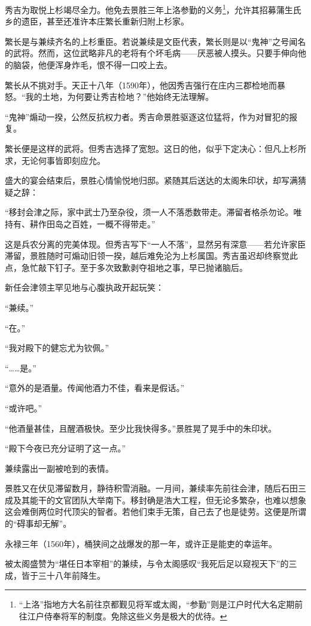\documentclass[
]{article}
\begin{document}
秀吉为取悦上杉竭尽全力。他免去景胜三年上洛参勤的义务\footnote{``上洛''指地方大名前往京都觐见将军或太阁，``参勤''则是江户时代大名定期前往江户侍奉将军的制度。免除这些义务是极大的优待。}，允许其招募蒲生氏乡的遗臣，甚至还准许本庄繁长重新归附上杉家。

繁长是与兼续齐名的上杉重臣。若说兼续是文臣代表，繁长则是以``鬼神''之号闻名的武将。然而，这位武略非凡的老将有个坏毛病------厌恶被人摸头。只要手伸向他的脑袋，他便浑身炸毛，恨不得一口咬上去。

繁长从不挑对手。天正十八年（1590年），他因秀吉强行在庄内三郡检地而暴怒。``我的土地，为何要让秀吉检地？''他始终无法理解。

``鬼神''煽动一揆，公然反抗权力者。秀吉命景胜驱逐这位猛将，作为对冒犯的报复。

繁长便是这样的武将。但秀吉选择了宽恕。这日的他，似乎下定决心：但凡上杉所求，无论何事皆即刻应允。

盛大的宴会结束后，景胜心情愉悦地归邸。紧随其后送达的太阁朱印状，却写满猜疑之辞：

``移封会津之际，家中武士乃至杂役，须一人不落悉数带走。滞留者格杀勿论。唯持有、耕作田岛之百姓，一概不得带走。''

这是兵农分离的完美体现。但秀吉写下``一人不落''，显然另有深意------若允许家臣滞留，景胜随时可煽动旧领一揆，越后难免沦为上杉属国。秀吉虽迟却终察觉此点，急忙敲下钉子。至于多次致歉剥夺祖地之事，早已抛诸脑后。

新任会津领主罕见地与心腹执政开起玩笑：

``兼续。''

``在。''

``我对殿下的健忘尤为钦佩。''

``\ldots\ldots 是。''

``意外的是酒量。传闻他酒力不佳，看来是假话。''

``或许吧。''

``他酒量甚佳，且醒酒极快。至少比我快得多。''景胜晃了晃手中的朱印状。

``殿下今夜已充分证明了这一点。''

兼续露出一副被呛到的表情。

景胜又在伏见滞留数月，静待积雪消融。一月间，兼续率先前往会津，随后石田三成及其能干的文官团队大举南下。移封确是浩大工程，但无论多繁杂，也难以想象这会难倒两位时代顶尖的智者。若他们束手无策，自己去了也是徒劳。这便是所谓的``碍事却无解''。

永禄三年（1560年），桶狭间之战爆发的那一年，或许正是能吏的幸运年。

被太阁盛赞为``堪任日本宰相''的兼续，与令太阁感叹``我死后足以窥视天下''的三成，皆于三十八年前降生。
\end{document}
